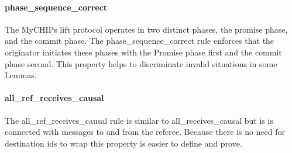 \documentclass[runningheads]{llncs}
\begin{document}
\paragraph{phase\_sequence\_correct}
The MyCHIPs lift protocol operates in two distinct phases, the promise phase, and the commit phase. The phase\_sequence\_correct rule enforces that the originator initiates these phases with the Promise phase first and the commit phase second. This property helps to discriminate invalid situations in some Lemmas.

\paragraph{all\_ref\_receives\_causal}
The all\_ref\_receives\_causal rule is similar to all\_receives\_causal but is is connected with messages to and from the referee. Because there is no need for destination ids to wrap this property is easier to define and prove. 



\end{document}

